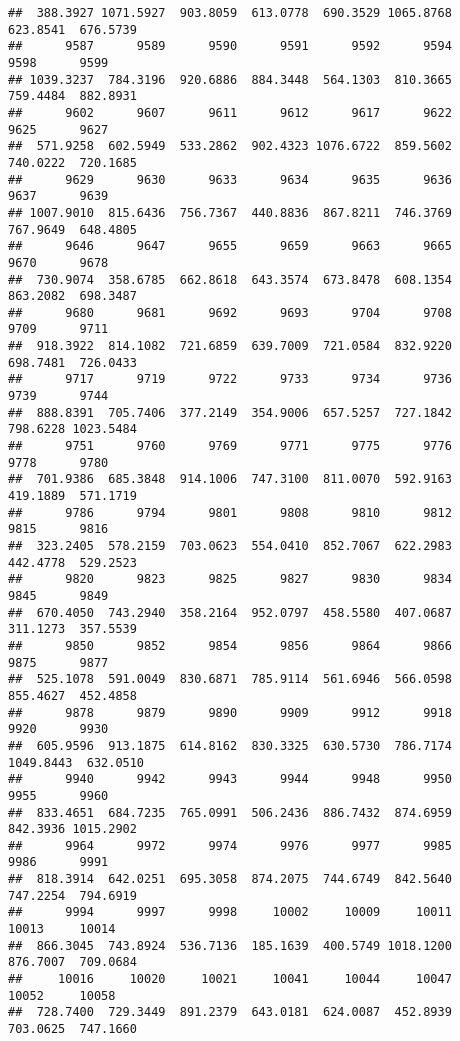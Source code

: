 \documentclass[
]{article}
\begin{document}
\begin{verbatim}
##  388.3927 1071.5927  903.8059  613.0778  690.3529 1065.8768  623.8541  676.5739 
##      9587      9589      9590      9591      9592      9594      9598      9599 
## 1039.3237  784.3196  920.6886  884.3448  564.1303  810.3665  759.4484  882.8931 
##      9602      9607      9611      9612      9617      9622      9625      9627 
##  571.9258  602.5949  533.2862  902.4323 1076.6722  859.5602  740.0222  720.1685 
##      9629      9630      9633      9634      9635      9636      9637      9639 
## 1007.9010  815.6436  756.7367  440.8836  867.8211  746.3769  767.9649  648.4805 
##      9646      9647      9655      9659      9663      9665      9670      9678 
##  730.9074  358.6785  662.8618  643.3574  673.8478  608.1354  863.2082  698.3487 
##      9680      9681      9692      9693      9704      9708      9709      9711 
##  918.3922  814.1082  721.6859  639.7009  721.0584  832.9220  698.7481  726.0433 
##      9717      9719      9722      9733      9734      9736      9739      9744 
##  888.8391  705.7406  377.2149  354.9006  657.5257  727.1842  798.6228 1023.5484 
##      9751      9760      9769      9771      9775      9776      9778      9780 
##  701.9386  685.3848  914.1006  747.3100  811.0070  592.9163  419.1889  571.1719 
##      9786      9794      9801      9808      9810      9812      9815      9816 
##  323.2405  578.2159  703.0623  554.0410  852.7067  622.2983  442.4778  529.2523 
##      9820      9823      9825      9827      9830      9834      9845      9849 
##  670.4050  743.2940  358.2164  952.0797  458.5580  407.0687  311.1273  357.5539 
##      9850      9852      9854      9856      9864      9866      9875      9877 
##  525.1078  591.0049  830.6871  785.9114  561.6946  566.0598  855.4627  452.4858 
##      9878      9879      9890      9909      9912      9918      9920      9930 
##  605.9596  913.1875  614.8162  830.3325  630.5730  786.7174 1049.8443  632.0510 
##      9940      9942      9943      9944      9948      9950      9955      9960 
##  833.4651  684.7235  765.0991  506.2436  886.7432  874.6959  842.3936 1015.2902 
##      9964      9972      9974      9976      9977      9985      9986      9991 
##  818.3914  642.0251  695.3058  874.2075  744.6749  842.5640  747.2254  794.6919 
##      9994      9997      9998     10002     10009     10011     10013     10014 
##  866.3045  743.8924  536.7136  185.1639  400.5749 1018.1200  876.7007  709.0684 
##     10016     10020     10021     10041     10044     10047     10052     10058 
##  728.7400  729.3449  891.2379  643.0181  624.0087  452.8939  703.0625  747.1660 

\end{verbatim}
\end{document}
